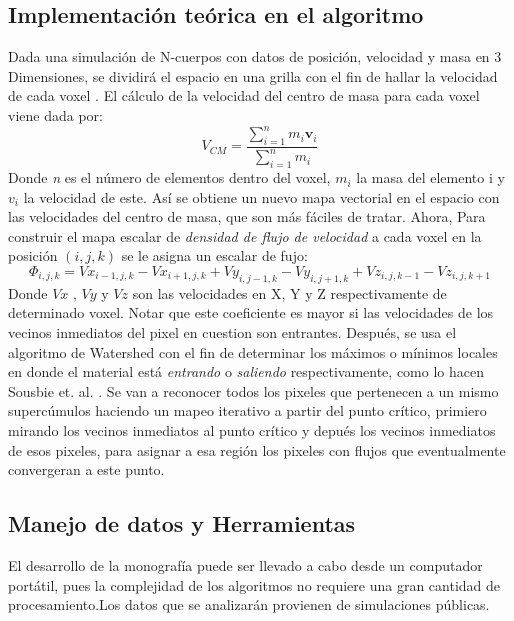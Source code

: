 \documentclass[12pt]{article}
\begin{document}
\subsection{Implementación teórica en el algoritmo}
Dada una simulación de N-cuerpos con datos de posición, velocidad y
masa en 3 Dimensiones, se dividirá el espacio en una grilla con el fin
de hallar la velocidad de cada voxel . El cálculo de la velocidad del
centro de masa para cada voxel viene dada por: 
\begin{equation}
V_{CM}=\frac{\sum_{i=1}^n m_i \textbf{v}_i}{\sum_{i=1}^n m_i} 
\end{equation}
Donde \textit{n} es el número de elementos dentro del voxel, $m_i$ la masa del elemento i y $v_i$ la velocidad de este.
Así se obtiene un nuevo mapa vectorial en el espacio con las velocidades del centro de masa, que son más fáciles de tratar. Ahora, Para construir el mapa escalar de \textit{densidad de flujo de velocidad} a cada voxel en la posición $(i,j,k)$ se le asigna un escalar de fujo:
\begin{equation}
\Phi_{i,j,k}=Vx_{i-1,j,k}-Vx_{i+1,j,k}+Vy_{i,j-1,k}-Vy_{i,j+1,k}+Vz_{i,j,k-1}-Vz_{i,j,k+1}
\end{equation}
Donde $Vx$ , $Vy$ y $Vz$ son las velocidades en X, Y y Z respectivamente de determinado voxel. Notar que este coeficiente  es mayor si las velocidades de los vecinos inmediatos del pixel en cuestion son entrantes. Después, se usa el algoritmo de Watershed \cite{WaterBeuch} \cite{SegmBeuch} con el fin de determinar los máximos o mínimos locales en donde el material está \textit{entrando} o \textit{saliendo} respectivamente, como lo hacen Sousbie et. al. \cite{FullyConn}. Se van a reconocer todos los pixeles que pertenecen a un mismo supercúmulos haciendo un mapeo iterativo a partir del punto crítico, primiero mirando los vecinos inmediatos al punto crítico y depués los vecinos inmediatos de esos pixeles, para asignar a esa región los pixeles con flujos que eventualmente convergeran a este punto.


\subsection{Manejo de datos y Herramientas}

El desarrollo de la monografía puede ser llevado a cabo desde un
computador portátil, pues la complejidad de los algoritmos no requiere
una gran cantidad de procesamiento.Los datos que se analizarán
provienen de simulaciones públicas\cite{simulations}. 
\end{document}
